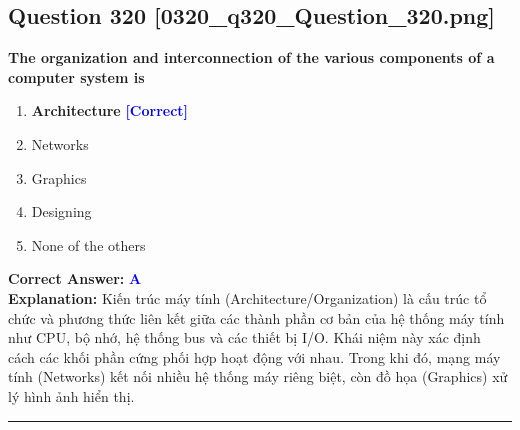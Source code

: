 \documentclass[11pt,a4paper]{article}
\begin{document}
\begin{minipage}{\textwidth}
\subsection*{Question 320 \quad \footnotesize{[0320\_q320\_Question\_320.png]}}
\noindent \textbf{The organization and interconnection of the various components of a computer system is}

\begin{enumerate}[label=\Alph*.]
    \item \textbf{Architecture} \hfill \textcolor{blue}{\textbf{[Correct]}}
    \item Networks
    \item Graphics
    \item Designing
    \item None of the others
\end{enumerate}

\noindent \textbf{Correct Answer:} \textcolor{blue}{\textbf{A}} \\[2pt]
\noindent \textbf{Explanation:} Kiến trúc máy tính (Architecture/Organization) là cấu trúc tổ chức và phương thức liên kết giữa các thành phần cơ bản của hệ thống máy tính như CPU, bộ nhớ, hệ thống bus và các thiết bị I/O. Khái niệm này xác định cách các khối phần cứng phối hợp hoạt động với nhau. Trong khi đó, mạng máy tính (Networks) kết nối nhiều hệ thống máy riêng biệt, còn đồ họa (Graphics) xử lý hình ảnh hiển thị.

\par\vspace{0.3cm}
\hrule
\vspace{0.3cm}
\end{minipage}
\end{document}
